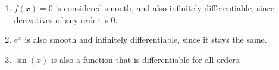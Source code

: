 \documentclass[11pt]{article}
\begin{document}
    \begin{enumerate}
        \item $f(x) = 0$ is considered smooth, and also infinitely differentiable, since derivatives of any order is 0.
    
        \item $e^x$ is also smooth and infinitely differentiable, since it stays the same.
    
        \item $\sin(x)$ is also a function that is differentiable for all orders.
    \end{enumerate}
\end{document}
